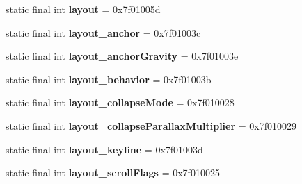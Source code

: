 \begin{DoxyCompactItemize}
\item 
\hypertarget{classandroid_1_1support_1_1design_1_1_r_1_1attr_a3aaf263ae2389f59b449db18688458be}{}static final int {\bfseries layout} = 0x7f01005d\label{classandroid_1_1support_1_1design_1_1_r_1_1attr_a3aaf263ae2389f59b449db18688458be}

\item 
\hypertarget{classandroid_1_1support_1_1design_1_1_r_1_1attr_a3e21ef336487fd263dc6e15b8fe3e6dd}{}static final int {\bfseries layout\+\_\+anchor} = 0x7f01003c\label{classandroid_1_1support_1_1design_1_1_r_1_1attr_a3e21ef336487fd263dc6e15b8fe3e6dd}

\item 
\hypertarget{classandroid_1_1support_1_1design_1_1_r_1_1attr_a03a22adfa172713854cd688456978661}{}static final int {\bfseries layout\+\_\+anchor\+Gravity} = 0x7f01003e\label{classandroid_1_1support_1_1design_1_1_r_1_1attr_a03a22adfa172713854cd688456978661}

\item 
\hypertarget{classandroid_1_1support_1_1design_1_1_r_1_1attr_aa690424f72fdba65a975e5e812780c53}{}static final int {\bfseries layout\+\_\+behavior} = 0x7f01003b\label{classandroid_1_1support_1_1design_1_1_r_1_1attr_aa690424f72fdba65a975e5e812780c53}

\item 
\hypertarget{classandroid_1_1support_1_1design_1_1_r_1_1attr_a73918d086000ebb3ad8010659a217a0d}{}static final int {\bfseries layout\+\_\+collapse\+Mode} = 0x7f010028\label{classandroid_1_1support_1_1design_1_1_r_1_1attr_a73918d086000ebb3ad8010659a217a0d}

\item 
\hypertarget{classandroid_1_1support_1_1design_1_1_r_1_1attr_ab2173014ba4a8ee69f0e09827602f535}{}static final int {\bfseries layout\+\_\+collapse\+Parallax\+Multiplier} = 0x7f010029\label{classandroid_1_1support_1_1design_1_1_r_1_1attr_ab2173014ba4a8ee69f0e09827602f535}

\item 
\hypertarget{classandroid_1_1support_1_1design_1_1_r_1_1attr_ae22d5ebf8c270969d1d114b91f10a685}{}static final int {\bfseries layout\+\_\+keyline} = 0x7f01003d\label{classandroid_1_1support_1_1design_1_1_r_1_1attr_ae22d5ebf8c270969d1d114b91f10a685}

\item 
\hypertarget{classandroid_1_1support_1_1design_1_1_r_1_1attr_abf06a4d322c60012a8612e711555e8c3}{}static final int {\bfseries layout\+\_\+scroll\+Flags} = 0x7f010025\label{classandroid_1_1support_1_1design_1_1_r_1_1attr_abf06a4d322c60012a8612e711555e8c3}


\end{DoxyCompactItemize}
